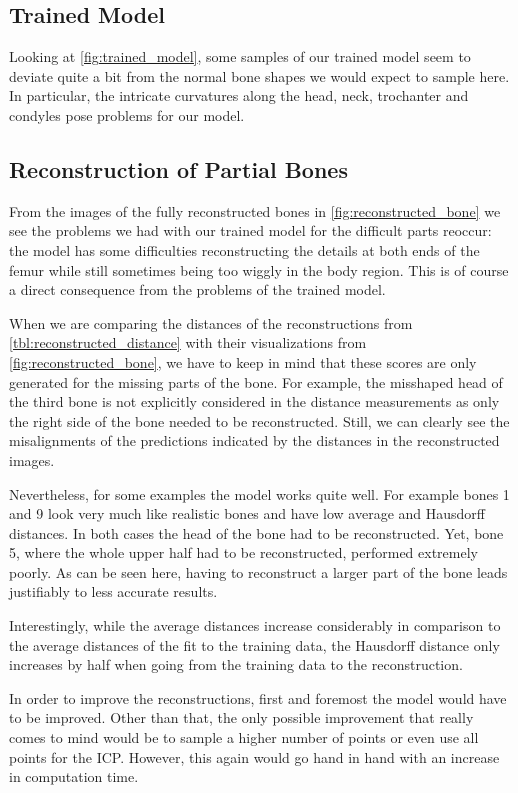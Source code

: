 \subsection{Trained Model}
\label{subsec:trainedmodeldisc}

Looking at \autoref{fig:trained_model}, some samples of our trained model seem to deviate quite a bit from the normal bone shapes we would expect to sample here. 
In particular, the intricate curvatures along the head, neck, trochanter and condyles pose problems for our model.


\subsection{Reconstruction of Partial Bones}
\label{subsec:reconresultsdisc}

From the images of the fully reconstructed bones in \autoref{fig:reconstructed_bone} we see the problems we had with our trained model for the difficult parts reoccur: the model has some difficulties reconstructing the details at both ends of the femur while still sometimes being too wiggly in the body region. 
This is of course a direct consequence from the problems of the trained model.

When we are comparing the distances of the reconstructions from \autoref{tbl:reconstructed_distance} with their visualizations from \autoref{fig:reconstructed_bone}, we have to keep in mind that these scores are only generated for the missing parts of the bone. 
For example, the misshaped head of the third bone is not explicitly considered in the distance measurements as only the right side of the bone needed to be reconstructed. 
Still, we can clearly see the misalignments of the predictions indicated by the distances in the reconstructed images.

Nevertheless, for some examples the model works quite well.
For example bones 1 and 9 look very much like realistic bones and have low average and Hausdorff distances. 
In both cases the head of the bone had to be reconstructed. 
Yet, bone 5, where the whole upper half had to be reconstructed, performed extremely poorly. 
As can be seen here, having to reconstruct a larger part of the bone leads justifiably to less accurate results.

Interestingly, while the average distances increase considerably in comparison to the average distances of the fit to the training data, the Hausdorff distance only increases by half when going from the training data to the reconstruction.

In order to improve the reconstructions, first and foremost the model would have to be improved. 
Other than that, the only possible improvement that really comes to mind would be to sample a higher number of points or even use all points for the ICP.
However, this again would go hand in hand with an increase in computation time.
